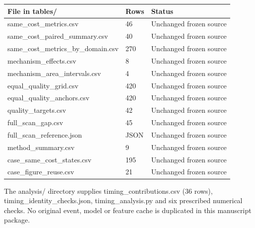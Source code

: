 \documentclass[11pt,a4paper]{article}
\begin{document}
{ %
\begin{longtable}[]{@{}lll@{}}
\toprule\noalign{}
File in tables/ & Rows & Status \\
\midrule\noalign{}
\endhead
\bottomrule\noalign{}
\endlastfoot
same\_cost\_metrics.csv & 46 & Unchanged frozen source \\
same\_cost\_paired\_summary.csv & 40 & Unchanged frozen source \\
same\_cost\_metrics\_by\_domain.csv & 270 & Unchanged frozen source \\
mechanism\_effects.csv & 8 & Unchanged frozen source \\
mechanism\_area\_intervals.csv & 4 & Unchanged frozen source \\
equal\_quality\_grid.csv & 420 & Unchanged frozen source \\
equal\_quality\_anchors.csv & 420 & Unchanged frozen source \\
quality\_targets.csv & 42 & Unchanged frozen source \\
full\_scan\_gap.csv & 45 & Unchanged frozen source \\
full\_scan\_reference.json & JSON & Unchanged frozen source \\
method\_summary.csv & 9 & Unchanged frozen source \\
case\_same\_cost\_states.csv & 195 & Unchanged frozen source \\
case\_figure\_reuse.csv & 21 & Unchanged frozen source \\
\end{longtable}
}

The analysis/ directory supplies timing\_contributions.csv (36 rows), timing\_identity\_checks.json, timing\_analysis.py and six prescribed numerical checks. No original event, model or feature cache is duplicated in this manuscript package.



\end{document}
